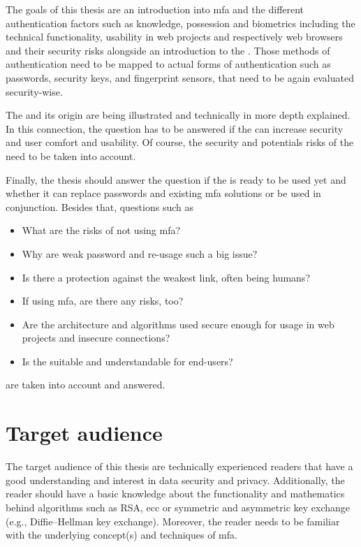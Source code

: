 The goals of this thesis are an introduction into \gls{mfa} and the different authentication factors such as \frqq knowledge, possession and biometrics\flqq{} including the technical functionality, usability in web projects and respectively web browsers and their security risks alongside an introduction to the \wa. Those methods of authentication need to be mapped to actual forms of authentication such as passwords, security keys, and fingerprint sensors, that need to be again evaluated security-wise.

The \wa{} and its origin are being illustrated and technically in more depth explained. In this connection, the question has to be answered if the \wa{} can increase security and user comfort and usability. Of course, the security and potentials risks of the \wa{} need to be taken into account.

Finally, the thesis should answer the question if the \wa{} is ready to be used yet and whether it can replace passwords and existing \gls{mfa} solutions or be used in conjunction.
Besides that, questions such as

\begin{itemize}
	\item What are the risks of not using \gls{mfa}?
	\item Why are weak password and re-usage such a big issue?
	\item Is there a protection against the weakest link, often being humans?
	\item If using \gls{mfa}, are there any risks, too?
	\item Are the architecture and algorithms used secure enough for usage in web projects and insecure connections?
	\item Is the \wa{} suitable and understandable for end-users?
\end{itemize}

are taken into account and answered.

\section{Target audience}

The target audience of this thesis are technically experienced readers that have a good understanding and interest in data security and privacy. Additionally, the reader should have a basic knowledge about the functionality and mathematics behind algorithms such as RSA, \gls{ecc} or symmetric and asymmetric key exchange (e.g., Diffie–Hellman key exchange). Moreover, the reader needs to be familiar with the underlying concept(s) and techniques of \gls{mfa}.

